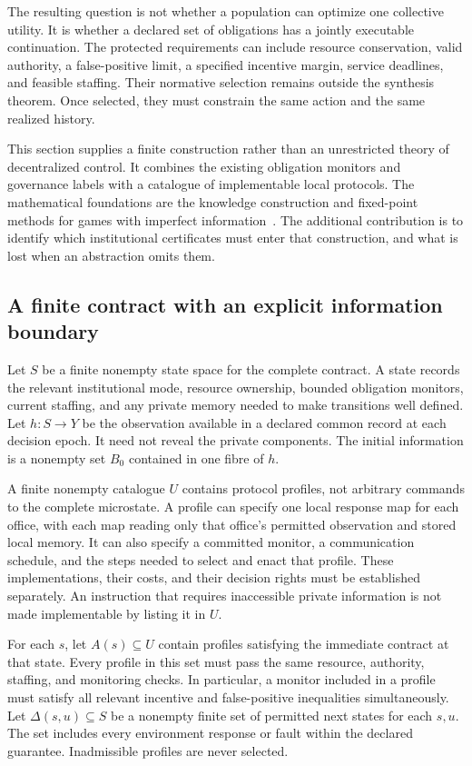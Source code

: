 \documentclass[11pt,letterpaper]{article}
\theoremstyle{plain}
\theoremstyle{definition}
\theoremstyle{remark}
\begin{document}
The resulting question is not whether a population can optimize one collective utility. It is whether a declared set of obligations has a jointly executable continuation. The protected requirements can include resource conservation, valid authority, a false-positive limit, a specified incentive margin, service deadlines, and feasible staffing. Their normative selection remains outside the synthesis theorem. Once selected, they must constrain the same action and the same realized history.

This section supplies a finite construction rather than an unrestricted theory of decentralized control. It combines the existing obligation monitors and governance labels with a catalogue of implementable local protocols. The mathematical foundations are the knowledge construction and fixed-point methods for games with imperfect information~\cite{chatterjee}. The additional contribution is to identify which institutional certificates must enter that construction, and what is lost when an abstraction omits them.

\subsection{A finite contract with an explicit information boundary}
Let $S$ be a finite nonempty state space for the complete contract. A state records the relevant institutional mode, resource ownership, bounded obligation monitors, current staffing, and any private memory needed to make transitions well defined. Let $h:S\to Y$ be the observation available in a declared common record at each decision epoch. It need not reveal the private components. The initial information is a nonempty set $B_0$ contained in one fibre of $h$.

A finite nonempty catalogue $U$ contains protocol profiles, not arbitrary commands to the complete microstate. A profile can specify one local response map for each office, with each map reading only that office's permitted observation and stored local memory. It can also specify a committed monitor, a communication schedule, and the steps needed to select and enact that profile. These implementations, their costs, and their decision rights must be established separately. An instruction that requires inaccessible private information is not made implementable by listing it in $U$.

For each $s$, let $A(s)\subseteq U$ contain profiles satisfying the immediate contract at that state. Every profile in this set must pass the same resource, authority, staffing, and monitoring checks. In particular, a monitor included in a profile must satisfy all relevant incentive and false-positive inequalities simultaneously. Let $\Delta(s,u)\subseteq S$ be a nonempty finite set of permitted next states for each $s,u$. The set includes every environment response or fault within the declared guarantee. Inadmissible profiles are never selected.
\end{document}
